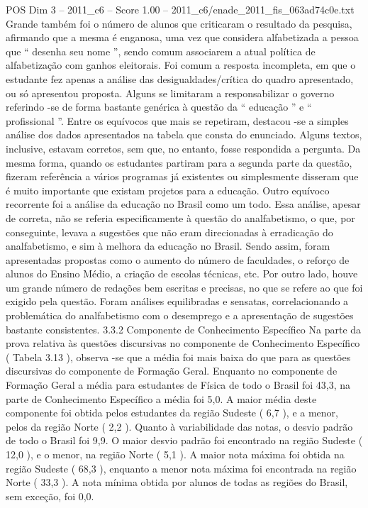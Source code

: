 \begin{textsample}{POS Dim 3 – 2011\_c6 – Score 1.00 – 2011\_c6/enade\_2011\_fis\_063ad74c0e.txt}
Grande também foi o número de alunos que criticaram o resultado da pesquisa, afirmando que a mesma é enganosa, uma vez que considera alfabetizada a pessoa que “ desenha seu nome ”, sendo comum associarem a atual política de alfabetização com ganhos eleitorais.
Foi comum a resposta incompleta, em que o estudante fez apenas a análise das desigualdades/crítica do quadro apresentado, ou só apresentou proposta.
Alguns se limitaram a responsabilizar o governo referindo -se de forma bastante genérica à questão da “ educação ” e “ profissional ”.
Entre os equívocos que mais se repetiram, destacou -se a simples análise dos dados apresentados na tabela que consta do enunciado.
Alguns textos, inclusive, estavam corretos, sem que, no entanto, fosse respondida a pergunta.
Da mesma forma, quando os estudantes partiram para a segunda parte da questão, fizeram referência a vários programas já existentes ou simplesmente disseram que é muito importante que existam projetos para a educação.
Outro equívoco recorrente foi a análise da educação no Brasil como um todo.
Essa análise, apesar de correta, não se referia especificamente à questão do analfabetismo, o que, por conseguinte, levava a sugestões que não eram direcionadas à erradicação do analfabetismo, e sim à melhora da educação no Brasil.
Sendo assim, foram apresentadas propostas como o aumento do número de faculdades, o reforço de alunos do Ensino Médio, a criação de escolas técnicas, etc.
Por outro lado, houve um grande número de redações bem escritas e precisas, no que se refere ao que foi exigido pela questão.
Foram análises equilibradas e sensatas, correlacionando a problemática do analfabetismo com o desemprego e a apresentação de sugestões bastante consistentes. 3.3.2 Componente de Conhecimento Específico Na parte da prova relativa às questões discursivas no componente de Conhecimento Específico ( Tabela 3.13 ), observa -se que a média foi mais baixa do que para as questões discursivas do componente de Formação Geral.
Enquanto no componente de Formação Geral a média para estudantes de Física de todo o Brasil foi 43,3, na parte de Conhecimento Específico a média foi 5,0.
A maior média deste componente foi obtida pelos estudantes da região Sudeste ( 6,7 ), e a menor, pelos da região Norte ( 2,2 ).
Quanto à variabilidade das notas, o desvio padrão de todo o Brasil foi 9,9.
O maior desvio padrão foi encontrado na região Sudeste ( 12,0 ), e o menor, na região Norte ( 5,1 ).
A maior nota máxima foi obtida na região Sudeste ( 68,3 ), enquanto a menor nota máxima foi encontrada na região Norte ( 33,3 ).
A nota mínima obtida por alunos de todas as regiões do Brasil, sem exceção, foi 0,0.

\end{textsample}
